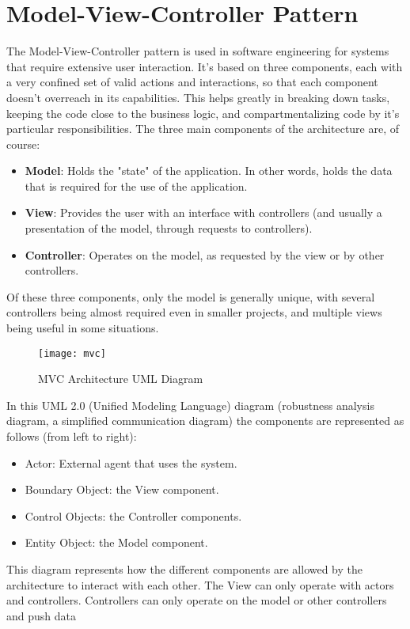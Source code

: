 \section{Model-View-Controller Pattern} \label{mvcpattern}
The Model-View-Controller pattern is used in software engineering for systems that require extensive user interaction. It's 
based on three components, each with a very confined set of valid actions and interactions, so that each component doesn't 
overreach in its capabilities. This helps greatly in breaking down tasks, keeping the code close to the business logic, and 
compartmentalizing code by it's particular responsibilities. The three main components of the architecture are, of course:
\begin{itemize}
	\item \textbf{Model}: Holds the "state" of the application. In other words, holds the data that is required for the use 
	of the application.
	\item \textbf{View}: Provides the user with an interface with controllers (and usually a presentation of the model, 
	through requests to controllers).
	\item \textbf{Controller}: Operates on the model, as requested by the view or by other controllers.
\end{itemize}
Of these three components, only the model is generally unique, with several controllers being almost required even in 
smaller projects, and multiple views being useful in some situations.
\begin{figure}[H]
\centering
\captionsetup{justification=centering}
\texttt{[image: mvc]}
\caption{MVC Architecture UML Diagram}
\end{figure}
In this UML 2.0 (Unified Modeling Language) diagram (robustness analysis diagram, a simplified communication diagram) the 
components are represented as follows (from left to right):
\begin{itemize}
	\item Actor: External agent that uses the system.
	\item Boundary Object: the View component.
	\item Control Objects: the Controller components.
	\item Entity Object: the Model component.
\end{itemize}
This diagram represents how the different components are allowed by the architecture to interact with each other. The View 
can only operate with actors and controllers. Controllers can only operate on the model or other controllers and push data 
